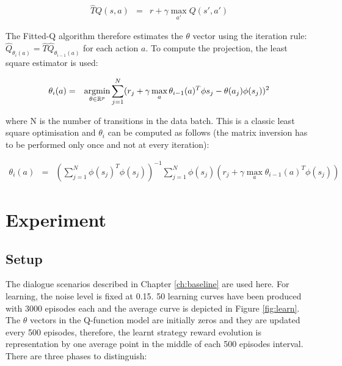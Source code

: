 				\begin{eqnarray}
					\hat{T} Q(s,a) & = & r + \gamma \max_{a'} Q(s',a')
				\end{eqnarray}
            
      	The Fitted-Q algorithm therefore estimates the $\theta$ vector using the iteration rule: $\hat{Q}_{\theta_i (a)} = \hat{T} \hat{Q}_{\theta_{i-1} (a)}$ for each action $a$. To compute the projection, the least square estimator is used:
        
				\begin{eqnarray}
					\theta_i (a) & = & \mathop{\hbox{argmin}}_{\theta \in \mathbb{R}^p} \sum_{j=1}^N (r_j + \gamma \mathop{\hbox{max}}_a \theta_{i-1}(a)^T \phi{s_j} - \theta (a_j) \phi(s_j))^2
				\end{eqnarray}
            
      	where N is the number of transitions in the data batch. This is a classic least square optimisation and $\theta_i$ can be computed as follows (the matrix inversion has to be performed only once and not at every iteration):
        
				\begin{eqnarray}
					\theta_i (a) & = & (\sum_{j=1}^N \phi(s_j)^T \phi(s_j))^{-1} \sum_{j=1}^N \phi(s_j) (r_j + \gamma \max_a \theta_{i-1}(a)^T \phi(s_j))
				\end{eqnarray}

\section{Experiment}
	
    \subsection{Setup}

		The dialogue scenarios described in Chapter \ref{ch:baseline} are used here. For learning, the noise level is fixed at 0.15. 50 learning curves have been produced with 3000 episodes each and the average curve is depicted in Figure \ref{fig:learn}. The $\theta$ vectors in the Q-function model are initially zeros and they are updated every 500 episodes, therefore, the learnt strategy reward evolution is representation by one average point in the middle of each 500 episodes interval. There are three phases to distinguish:
        
